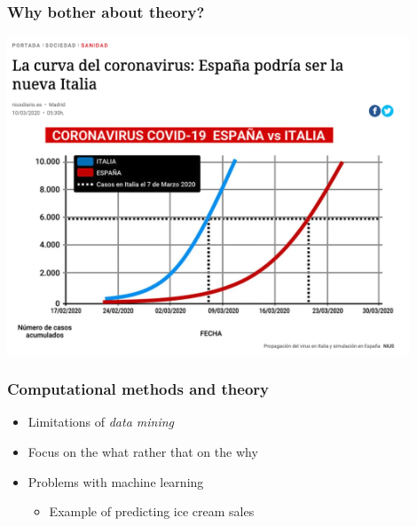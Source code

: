 \documentclass[aspectratio=43]{beamer}
\begin{document}
\begin{frame}
\frametitle{Why bother about theory?}
\centering

\includegraphics[width = 0.9\textwidth]{../img/covid_exp}

\end{frame}

\begin{frame}
\frametitle{Computational methods and theory}
\centering

\begin{itemize}
  \item Limitations of \textit{data mining}
  \item Focus on the what rather that on the why
  \item Problems with machine learning
  \begin{itemize}
    \item Example of predicting ice cream sales
  \end{itemize}
\end{itemize}

\end{frame}
\end{document}
